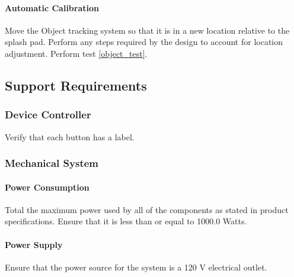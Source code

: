 \paragraph{Automatic Calibration}
Move the Object tracking system so that it is in a new location relative to the splash pad. Perform any steps required by the design to account for location adjustment. Perform test \ref{object_test}. 

\subsection{Support Requirements}

\subsubsection{Device Controller}
Verify that each button has a label. 



\subsubsection{Mechanical System}

\paragraph{Power Consumption}
Total the maximum power used by all of the components as stated in product specifications. Ensure that it is less than or equal to 1000.0 Watts. 

\paragraph{Power Supply}
Ensure that the power source for the system is a 120 V electrical outlet. 

